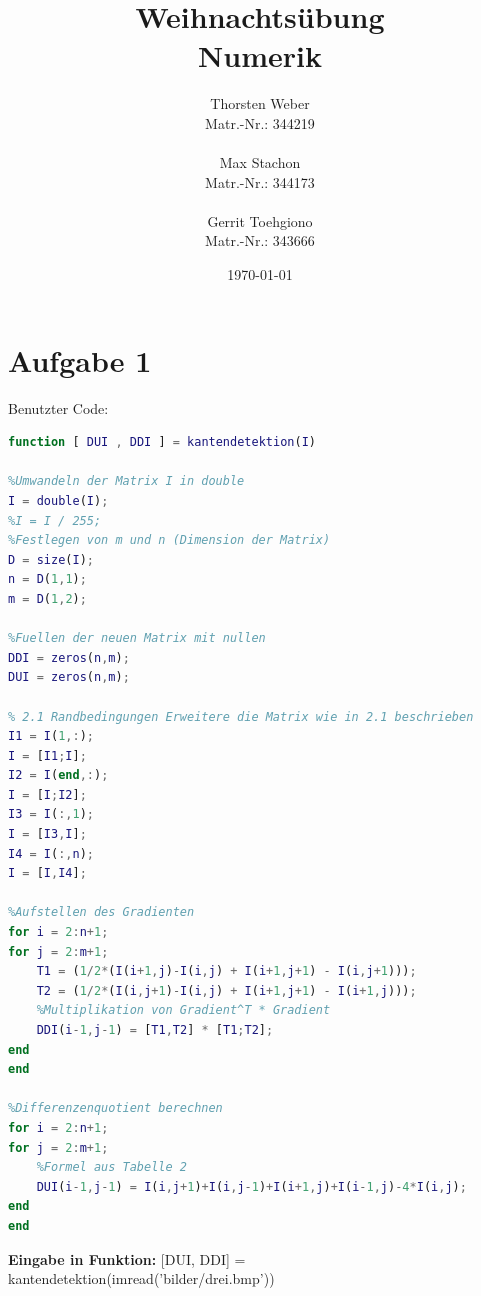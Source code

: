 \documentclass[12pt,a4paper,oneside]{article}
\title{Weihnachtsübung\\
  \textbf{Numerik
  }
}
\author{Thorsten Weber\\
  Matr.-Nr.: 344219\\
  \\Max Stachon\\
  Matr.-Nr.: 344173\\
  \\Gerrit Toehgiono\\
  Matr.-Nr.: 343666
}
\date{\today}
\begin{document}
\clearpage
\maketitle
\thispagestyle{empty}
\newpage

\section*{Aufgabe 1}
Benutzter Code: \\
\begin{lstlisting}[language=Matlab,frame=single]
function [ DUI , DDI ] = kantendetektion(I)

%Umwandeln der Matrix I in double
I = double(I);
%I = I / 255;
%Festlegen von m und n (Dimension der Matrix)
D = size(I);
n = D(1,1);
m = D(1,2);

%Fuellen der neuen Matrix mit nullen
DDI = zeros(n,m);
DUI = zeros(n,m);

% 2.1 Randbedingungen Erweitere die Matrix wie in 2.1 beschrieben
I1 = I(1,:);
I = [I1;I];
I2 = I(end,:);
I = [I;I2];
I3 = I(:,1);
I = [I3,I];
I4 = I(:,n);
I = [I,I4];

%Aufstellen des Gradienten
for i = 2:n+1;
for j = 2:m+1;
    T1 = (1/2*(I(i+1,j)-I(i,j) + I(i+1,j+1) - I(i,j+1)));
    T2 = (1/2*(I(i,j+1)-I(i,j) + I(i+1,j+1) - I(i+1,j)));
    %Multiplikation von Gradient^T * Gradient
    DDI(i-1,j-1) = [T1,T2] * [T1;T2];    
end
end

%Differenzenquotient berechnen
for i = 2:n+1;
for j = 2:m+1;
    %Formel aus Tabelle 2
    DUI(i-1,j-1) = I(i,j+1)+I(i,j-1)+I(i+1,j)+I(i-1,j)-4*I(i,j);
end
end
\end{lstlisting}
\textbf{Eingabe in Funktion:} [DUI, DDI] = kantendetektion(imread('bilder/drei.bmp'))
\end{document}
